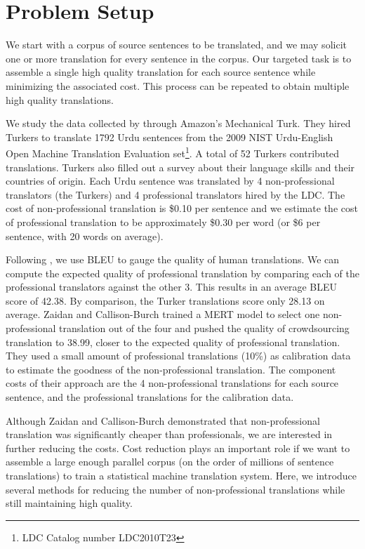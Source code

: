 \documentclass[11pt,letterpaper]{article}
\begin{document}
\section{Problem Setup}

We start with a corpus of source sentences to be translated, and we may solicit one or more translation for every sentence in the corpus.  Our targeted task is to assemble a single high quality translation for each source sentence while minimizing the associated cost. This process can be repeated to obtain multiple high quality translations.

We study the data collected by  through Amazon's Mechanical Turk. 
They hired Turkers to translate 1792 Urdu sentences 
from the  2009 NIST Urdu-English Open Machine Translation Evaluation set\footnote{LDC Catalog number LDC2010T23}. A total of 52 Turkers contributed translations. Turkers also filled out a survey about their language skills and their countries of origin. Each Urdu sentence was translated by 4 non-professional translators (the Turkers) and 4 professional translators hired by the LDC. The cost of non-professional translation is  \$0.10 per sentence and we estimate the cost of professional translation to be approximately \$0.30 per word (or \$6 per sentence, with 20 words on average). 

Following , we use BLEU \cite{papineni2002bleu} to gauge the quality of human translations.  We can compute the expected quality of professional translation by comparing each of the professional translators against the other 3.  This results in an average BLEU score of  42.38.  By comparison, the Turker translations score only 28.13 on average. Zaidan and Callison-Burch trained a MERT \cite{och2003minimum,Zaidan09zmert} model to select one non-professional translation out of the four and pushed the quality of crowdsourcing translation to 38.99, closer to the expected quality of professional translation. They used a small amount of professional translations (10\%) as calibration data to estimate the goodness of the non-professional translation. The component costs of their approach are the 4 non-professional translations for each source sentence, and the professional translations for the calibration data.

Although Zaidan and Callison-Burch demonstrated that non-professional translation was significantly cheaper than professionals, we are interested in further reducing the costs.  Cost reduction plays an important role if we want to assemble a large enough parallel corpus (on the order of millions of sentence translations) to train a statistical machine translation system. 
Here, we introduce several methods for reducing the number of non-professional translations  while still maintaining high quality. 
\end{document}
